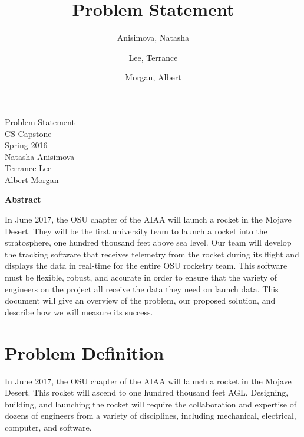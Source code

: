 \documentclass[10pt,journal,draftclsnofoot,onecolumn]{IEEEtran}
\begin{document}
	\singlespace
	
	\title{\vspace{2in}Problem Statement}
	
	\author {
		Anisimova, Natasha
		\and
		Lee, Terrance
		\and
		Morgan, Albert
	}
	
	
	\pagestyle{empty}
	\vspace*{2in}
	\begin{center}
		\huge
		Problem Statement\\
		\normalsize
		\vspace{5mm}
		CS Capstone\\
		Spring 2016\\
		\vspace{5mm}
		Natasha Anisimova\\
		Terrance Lee\\
		Albert Morgan
	\end{center}
	
	\vspace{5mm}
	
	\begin{center}
		\textbf{Abstract}
	\end{center}
	
	\begin{adjustwidth}{2in}{2in}
		In June 2017, the OSU chapter of the
		AIAA will launch a rocket in the Mojave Desert.
		They will be the first university team to launch a rocket into the stratosphere, one hundred thousand feet above 
		sea level.
		Our team will develop the tracking software that receives
		telemetry from the rocket during its flight
		and displays the data in real-time for the entire OSU rocketry team.
		This software must be flexible, robust, and accurate in order
		to ensure that the variety of engineers on the project all receive
		the data they need on launch data.
		This document will give an overview of the problem,
		our proposed solution,
		and describe how we will measure its success.
	\end{adjustwidth}
	
	\newpage
	\pagestyle{headings}
	\section{Problem Definition}
	In June 2017, the \ac{OSU} chapter of the
	\ac{AIAA} will launch a rocket in the Mojave Desert.
	This rocket will ascend to one hundred thousand feet \ac{AGL}.
	Designing, building, and launching the rocket will require the
	collaboration and expertise of dozens of engineers from a variety
	of disciplines, including mechanical, electrical, computer, and
	software.
\end{document}
